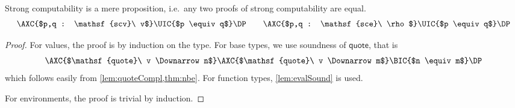 \documentclass[a4paper,UKenglish,cleveref]{lipics-v2019}
\newcommand{\agdaSymb}[1]{\mathsf{#1}}
\newcommand{\q}{\agdaSymb{quote}}
\newcommand{\scv}{\agdaSymb{scv}}
\newcommand{\sce}{\agdaSymb{sce}}
\newcommand{\Da}{\Downarrow}
\begin{document}
\begin{lemma}
  Strong computability is a mere proposition, i.e.\ any two proofs of strong
  computability are equal.
  \label{lem:scvProp}
  \[
    \AXC{$p,q : \scv\ v$}\UIC{$p \equiv q$}\DP \qquad
    \AXC{$p,q : \sce\ \rho$}\UIC{$p \equiv q$}\DP
  \]
\end{lemma}
\begin{proof}
  For values, the proof is by induction on the type.
  For base types, we use soundness of $\q$, that is
  \[
    \AXC{$\q\ v \Da n$}
    \AXC{$\q\ v \Da m$}
    \BIC{$n \equiv m$}
    \DP
  \]
  which follows easily from \cref{lem:quoteCompl,thm:nbe}.
  For function types, \cref{lem:evalSound} is used.

  For environments, the proof is trivial by induction.
\end{proof}
\end{document}

